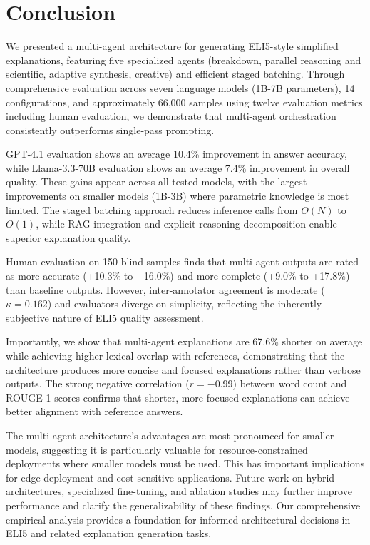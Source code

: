 \section{Conclusion}

We presented a multi-agent architecture for generating ELI5-style simplified explanations, featuring five specialized agents (breakdown, parallel reasoning and scientific, adaptive synthesis, creative) and efficient staged batching. Through comprehensive evaluation across seven language models (1B-7B parameters), 14 configurations, and approximately 66,000 samples using twelve evaluation metrics including human evaluation, we demonstrate that multi-agent orchestration consistently outperforms single-pass prompting.

GPT-4.1 evaluation shows an average 10.4\% improvement in answer accuracy, while Llama-3.3-70B evaluation shows an average 7.4\% improvement in overall quality. These gains appear across all tested models, with the largest improvements on smaller models (1B-3B) where parametric knowledge is most limited. The staged batching approach reduces inference calls from $O(N)$ to $O(1)$, while RAG integration and explicit reasoning decomposition enable superior explanation quality.

Human evaluation on 150 blind samples finds that multi-agent outputs are rated as more accurate (+10.3\% to +16.0\%) and more complete (+9.0\% to +17.8\%) than baseline outputs. However, inter-annotator agreement is moderate ($\kappa=0.162$) and evaluators diverge on simplicity, reflecting the inherently subjective nature of ELI5 quality assessment.

Importantly, we show that multi-agent explanations are 67.6\% shorter on average while achieving higher lexical overlap with references, demonstrating that the architecture produces more concise and focused explanations rather than verbose outputs. The strong negative correlation ($r = -0.99$) between word count and ROUGE-1 scores confirms that shorter, more focused explanations can achieve better alignment with reference answers.

The multi-agent architecture's advantages are most pronounced for smaller models, suggesting it is particularly valuable for resource-constrained deployments where smaller models must be used. This has important implications for edge deployment and cost-sensitive applications. Future work on hybrid architectures, specialized fine-tuning, and ablation studies may further improve performance and clarify the generalizability of these findings. Our comprehensive empirical analysis provides a foundation for informed architectural decisions in ELI5 and related explanation generation tasks.
